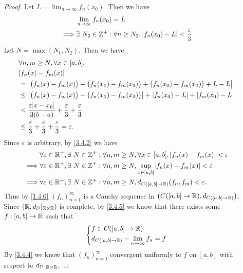 \begin{proof}
  Let \(L = \lim_{n \to \infty} f_n(x_0)\).
  Then we have
  \begin{align*}
             & \lim_{n \to \infty} f_n(x_0) = L                                                        \\
    \implies & \exists\ N_2 \in \mathbb{Z}^+ : \forall n \geq N_2, \left\lvert f_n(x_0) - L\right\rvert < \dfrac{\varepsilon}{3}
  \end{align*}
  Let \(N = \max(N_1, N_2)\).
  Then we have
  \begin{align*}
     & \forall n, m \geq N, \forall x \in [a, b],                                                                     \\
     & \abs{f_n(x) - f_m(x)}                                                                                          \\
     & = \abs{\big(f_n(x) - f_m(x)\big) - \big(f_n(x_0) - f_m(x_0)\big) + \big(f_n(x_0) - f_m(x_0)\big) + L - L}      \\
     & \leq \abs{\big(f_n(x) - f_m(x)\big) - \big(f_n(x_0) - f_m(x_0)\big)} + \abs{f_n(x_0) - L} + \abs{f_m(x_0) - L} \\
     & < \dfrac{\varepsilon \abs{x - x_0}}{3(b - a)} + \dfrac{\varepsilon}{3} + \dfrac{\varepsilon}{3}                \\
     & \leq \dfrac{\varepsilon}{3} + \dfrac{\varepsilon}{3} + \dfrac{\varepsilon}{3} = \varepsilon.
  \end{align*}
  Since \(\varepsilon\) is arbitrary, by \cref{3.4.2} we have
  \begin{align*}
             & \forall \varepsilon \in \R^+, \exists\ N \in \Z^+ : \forall n, m \geq N, \forall x \in [a, b], \abs{f_n(x) - f_m(x)} < \varepsilon \\
    \implies & \forall \varepsilon \in \R^+, \exists\ N \in \Z^+ : \forall n, m \geq N, \sup_{x \in [a, b]}\abs{f_n(x) - f_m(x)} < \varepsilon    \\
    \implies & \forall \varepsilon \in \R^+, \exists\ N \in \Z^+ : \forall n, m \geq N, d_{C([a, b] \to \R)}(f_n, f_m) < \varepsilon.
  \end{align*}
  Thus by \cref{1.4.6} \((f_n)_{n = 1}^\infty\) is a Cauchy sequence in \(\big(C([a, b] \to \mathbb{R}), d_{C([a, b] \to \mathbb{R})}\big)\).
  Since \((\mathbb{R}, d_{l^1}|_{\mathbb{R} \times \mathbb{R}})\) is complete, by \cref{3.4.5} we know that there exists some \(f : [a, b] \to \mathbb{R}\) such that
  \[
    \begin{dcases}
      f \in C([a, b] \to \mathbb{R}) \\
      d_{C([a, b] \to \mathbb{R})} - \lim_{n \to \infty} f_n = f
    \end{dcases}
  \]
  By \cref{3.4.4} we know that \((f_n)_{n = 1}^\infty\) convergent uniformly to \(f\) on \([a, b]\) with respect to \(d_{l^1}|_{\mathbb{R} \times \mathbb{R}}\).


\end{proof}
